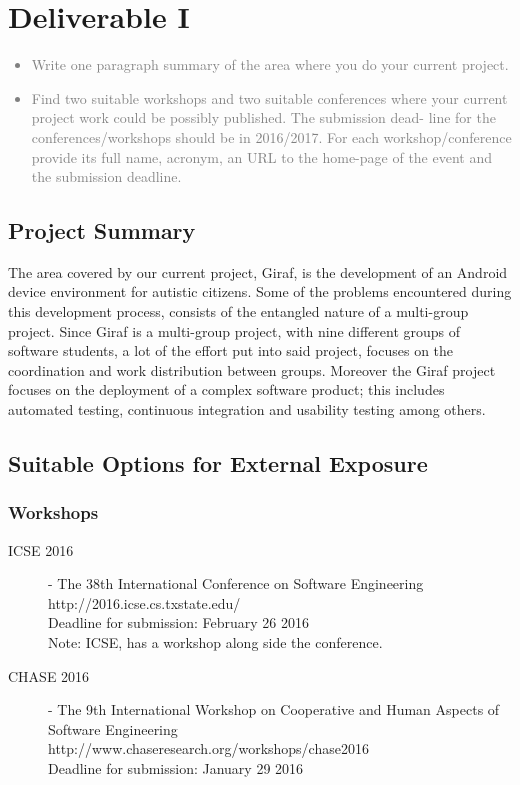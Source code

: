 \chapter{Deliverable I}
\textcolor{gray}{%
\begin{itemize}
    \item Write one paragraph summary of the area where you do your current project.
    \item Find two suitable workshops and two suitable conferences where your current project work could be possibly published. The submission dead- line for the conferences/workshops should be in 2016/2017. For each workshop/conference provide its full name, acronym, an URL to the home-page of the event and the submission deadline.
\end{itemize}}
\section{Project Summary} %
\label{sec:project_summary}
The area covered by our current project, Giraf, is the development of an Android device environment for autistic citizens. 
Some of the problems encountered during this development process, consists of the entangled nature of a multi-group project. 
Since Giraf is a multi-group project, with nine different groups of software students, a lot of the effort put into said project, focuses on the coordination and work distribution between groups. 
Moreover the Giraf project focuses on the deployment of a complex software product; this includes automated testing, continuous integration and usability testing among others.

\section{Suitable Options for External Exposure}
\subsection{Workshops}
\begin{description}
    \item[ICSE 2016] - The 38th International Conference on Software Engineering \\
    http://2016.icse.cs.txstate.edu/ \\
Deadline for submission: February 26 2016 \\
Note: ICSE, has a workshop along side the conference.
    \item[CHASE 2016] - The 9th International Workshop on Cooperative and Human Aspects of Software Engineering \\
http://www.chaseresearch.org/workshops/chase2016 \\
Deadline for submission: January 29 2016
\end{description}             
